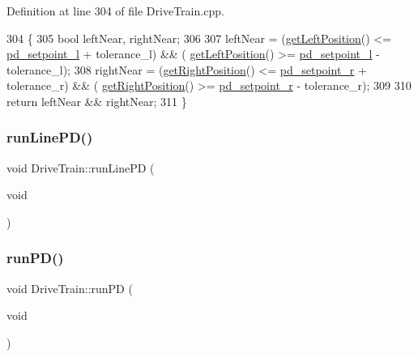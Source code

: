 Definition at line 304 of file Drive\+Train.\+cpp.


\begin{DoxyCode}
304                                                                      \{
305     \textcolor{keywordtype}{bool} leftNear, rightNear;
306 
307     leftNear = (\hyperlink{class_drive_train_a9ec0f8309cf9670fec618e8b00f70390}{getLeftPosition}() <= \hyperlink{class_drive_train_a44be549ca050bf41e9b2474a2640200b}{pd\_setpoint\_l} + tolerance\_l) && (
      \hyperlink{class_drive_train_a9ec0f8309cf9670fec618e8b00f70390}{getLeftPosition}() >= \hyperlink{class_drive_train_a44be549ca050bf41e9b2474a2640200b}{pd\_setpoint\_l} - tolerance\_l);
308     rightNear = (\hyperlink{class_drive_train_aa52a34fcdfad88883c78b81336661137}{getRightPosition}() <= \hyperlink{class_drive_train_a57e389649151326bf84ab4bd13b6b61c}{pd\_setpoint\_r} + tolerance\_r) && (
      \hyperlink{class_drive_train_aa52a34fcdfad88883c78b81336661137}{getRightPosition}() >= \hyperlink{class_drive_train_a57e389649151326bf84ab4bd13b6b61c}{pd\_setpoint\_r} - tolerance\_r);
309 
310     \textcolor{keywordflow}{return} leftNear && rightNear;
311 \}
\end{DoxyCode}
\mbox{\label{class_drive_train_a42bf43e9e989feeead853a71afe8bbb0}} 
\subsubsection{\texorpdfstring{run\+Line\+P\+D()}{runLinePD()}}
{\footnotesize\ttfamily void Drive\+Train\+::run\+Line\+PD (\begin{DoxyParamCaption}\item[{void}]{ }\end{DoxyParamCaption})}

\mbox{\label{class_drive_train_a8355f8e214ceb1ecf1bce299ba692b22}} 
\subsubsection{\texorpdfstring{run\+P\+D()}{runPD()}}
{\footnotesize\ttfamily void Drive\+Train\+::run\+PD (\begin{DoxyParamCaption}\item[{void}]{ }\end{DoxyParamCaption})}



